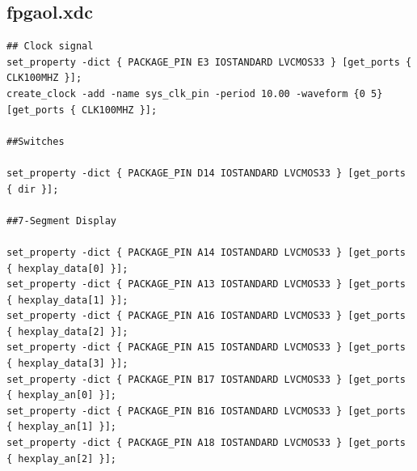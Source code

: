 \documentclass{ctexart}
\begin{document}
\subsection{fpgaol.xdc}
\begin{lstlisting}
## Clock signal
set_property -dict { PACKAGE_PIN E3 IOSTANDARD LVCMOS33 } [get_ports { CLK100MHZ }];
create_clock -add -name sys_clk_pin -period 10.00 -waveform {0 5} [get_ports { CLK100MHZ }];

##Switches

set_property -dict { PACKAGE_PIN D14 IOSTANDARD LVCMOS33 } [get_ports { dir }];

##7-Segment Display

set_property -dict { PACKAGE_PIN A14 IOSTANDARD LVCMOS33 } [get_ports { hexplay_data[0] }];
set_property -dict { PACKAGE_PIN A13 IOSTANDARD LVCMOS33 } [get_ports { hexplay_data[1] }];
set_property -dict { PACKAGE_PIN A16 IOSTANDARD LVCMOS33 } [get_ports { hexplay_data[2] }];
set_property -dict { PACKAGE_PIN A15 IOSTANDARD LVCMOS33 } [get_ports { hexplay_data[3] }];
set_property -dict { PACKAGE_PIN B17 IOSTANDARD LVCMOS33 } [get_ports { hexplay_an[0] }];
set_property -dict { PACKAGE_PIN B16 IOSTANDARD LVCMOS33 } [get_ports { hexplay_an[1] }];
set_property -dict { PACKAGE_PIN A18 IOSTANDARD LVCMOS33 } [get_ports { hexplay_an[2] }];
\end{lstlisting}
\end{document}
